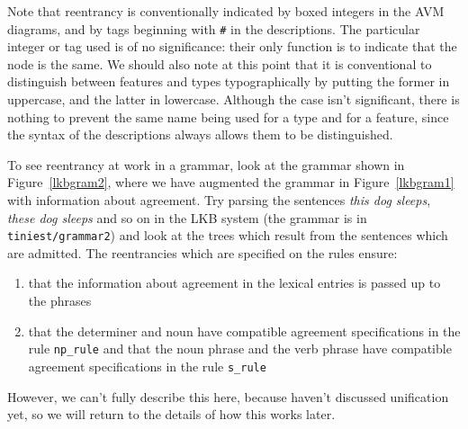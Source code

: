 \documentclass[12pt]{report}
\begin{document}
Note that reentrancy is conventionally indicated by boxed integers
in the AVM diagrams, and by tags beginning with \verb+#+
in the descriptions.  The particular integer or tag
used is of no significance: their only function is to indicate
that the node is the same.  We should also note at this point that
it is conventional to distinguish between features and types
typographically by putting the former in uppercase, and the latter 
in lowercase.  Although the case isn't significant, there is nothing
to prevent the same name being used for a type and for a feature,
since the syntax of the descriptions always allows them to be distinguished.

To see reentrancy at work in a grammar, look at the grammar shown
in Figure~\ref{lkbgram2}, where we have augmented the grammar in
Figure~\ref{lkbgram1} with
information about agreement.  Try parsing the sentences {\it this dog sleeps},
{\it these dog sleeps} and so on in the LKB system (the grammar is in
{\tt tiniest/grammar2}) and look at the trees which
result from the sentences which are admitted.
The reentrancies which are specified 
on the rules ensure:
\begin{enumerate}
\item that the information about agreement in the lexical entries
is passed up to the phrases
\item that the determiner and noun have compatible agreement specifications
in the rule {\tt np\_rule} and that the noun phrase and the verb phrase
have compatible agreement specifications
in the rule {\tt s\_rule}
\end{enumerate}
However, we can't fully describe this here, because
haven't discussed unification yet, so we
will return to the details of how this works later.
\end{document}
